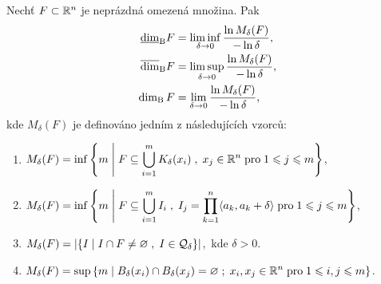 \begin{theorem}\label{thm:ekvivalentni-def-box-counting-dimenze}
    Nechť $F\subset \mathbb{R}^n$ je neprázdná omezená množina. Pak
    \begin{align*}
        \underline{\dim}_\textup{B}{F}&=\liminf_{\delta\to 0}\dfrac{\ln{M_\delta(F)}}{-\ln{\delta}},\\
        \overline{\dim}_\textup{B}{F}&=\limsup_{\delta\to 0}\dfrac{\ln{M_\delta(F)}}{-\ln{\delta}},\\
        \operatorname{dim_B}{F}&=\lim_{\delta\to 0}\dfrac{\ln{M_\delta(F)}}{-\ln{\delta}},
    \end{align*}
    kde $M_\delta(F)$ je definováno jedním z následujících vzorců:
    \begin{enumerate}[label=(\roman*)]
        \item\label{thm:pokryti-delta-uz-koulemi} $\displaystyle M_\delta(F)=\inf\left\{m\;\middle|\;F\subseteq\bigcup\limits_{i=1}^m K_\delta(x_i)\;,\;x_j\in\mathbb{R}^n\;\text{pro}\;1\leqslant j\leqslant m\right\}$,
        \item\label{thm:pokryti-delta-kvadry} $\displaystyle M_\delta(F)=\inf\left\{m\;\middle|\;F\subseteq\bigcup\limits_{i=1}^m I_i\;,\;I_j=\prod_{k=1}^{n}\langle a_k,a_k+\delta\rangle\;\text{pro}\;1\leqslant j\leqslant m\right\}$,
        \item\label{thm:pokryti-delta-sit} $\displaystyle M_\delta(F)=\left|\left\{I\;\middle|\;I\cap F\neq\varnothing\;,\;I\in\mathcal{Q}_\delta\right\}\right|$,~kde $\delta>0$.
        \item\label{thm:pokryti-delta-dis-ot-koulemi} $\displaystyle M_\delta(F)=\sup\left\{m\;\middle|\;B_\delta(x_i)\cap B_\delta(x_j)=\varnothing\;;\;x_i,x_j\in\mathbb{R}^n\;\text{pro}\;1\leqslant i,j\leqslant m\right\}$.
    \end{enumerate}
\end{theorem}

